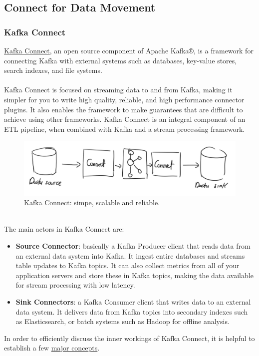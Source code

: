 \documentclass[10pt,a4paper]{article}
\newcommand{\nline}{\\~\\}
\begin{document}
\subsection{Connect for Data Movement}
\subsubsection{Kafka Connect}
\href{https://docs.confluent.io/current/connect/index.html}{Kafka Connect}, an open source component of Apache Kafka®, is a framework for connecting Kafka with external systems such as databases, key-value stores, search indexes, and file systems.
\nline
Kafka Connect is focused on streaming data to and from Kafka, making it simpler for you to write high quality, reliable, and high performance connector plugins. It also enables the framework to make guarantees that are difficult to achieve using other frameworks. Kafka Connect is an integral component of an ETL pipeline, when combined with Kafka and a stream processing framework.
\begin{figure}[ht!]
 \hfill \includegraphics[width=330pt]{images/kafka-connect}\hspace*{\fill}
 \caption{Kafka Connect: simpe, scalable and reliable.}
\end{figure} \\
The main actors in Kafka Connect are:
\begin{itemize}
	\item \textbf{Source Connector}: basically a Kafka Producer client that reads data from an external data system into Kafka. It ingest entire databases and streams table updates to Kafka topics. It can also collect metrics from all of your application servers and store these in Kafka topics, making the data available for stream processing with low latency.
	\item \textbf{Sink Connectors}: a Kafka Consumer client that writes data to an external data system. It delivers data from Kafka topics into secondary indexes such as Elasticsearch, or batch systems such as Hadoop for offline analysis.
\end{itemize}
In order to efficiently discuss the inner workings of Kafka Connect, it is helpful to establish a few \href{https://docs.confluent.io/current/connect/concepts.html}{major concepts}.
\end{document}
